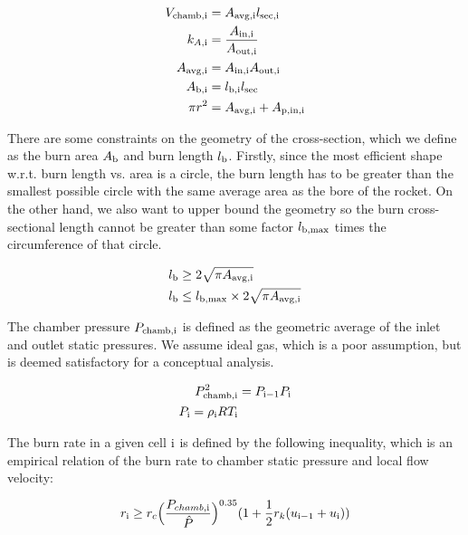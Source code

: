 \begin{align}
    V_{\rm{chamb}, \rm{i}} &= A_{\rm{avg}, \rm{i}} l_{\rm{sec}, \rm{i}} \\
    k_{A, \rm{i}} &= \frac{A_{\rm{in}, \rm{i}}}{A_{\rm{out}, \rm{i}}}  \\
    A_{\rm{avg, i}} &= A_{\rm{in}, \rm{i}} A_{\rm{out}, \rm{i}} \\
    A_{\rm{b, i}} &= l_{\rm{b,i}} l_{\rm{sec}} \\
    \pi r^2 &= A_{\rm{avg, i}} + A_{\rm{p, in, i}}
\end{align}

There are some constraints on the geometry of the cross-section, which we define
as the burn area $A_{\rm{b}}$ and burn length $l_{\rm{b}}$. Firstly, since the most efficient
shape w.r.t. burn length vs. area is a circle, the burn length has to be greater than the smallest possible circle
with the same average area as the bore of the rocket. On the other hand, we also want to
upper bound the geometry so the burn cross-sectional length cannot be greater than some factor
$l_{\rm{b,max}}$ times the circumference of that circle.

\begin{align}
    l_{\rm{b}} &\geq 2 \sqrt{\pi A_{\rm{avg, i}}} \\
    l_{\rm{b}} &\leq l_{\rm{b,max}} \times 2 \sqrt{\pi A_{\rm{avg, i}}}
\end{align}

The chamber pressure $P_{\rm{chamb}, \rm{i}}$ is defined as the geometric average of
the inlet and outlet static pressures. We assume ideal gas, which is a poor assumption,
but is deemed satisfactory for a conceptual analysis.

\begin{align}
    P_{\rm{chamb}, \rm{i}}^2 &= P_{\rm{i}-1} P_{\rm{i}} \\
    P_{\rm{i}} = \rho_{\rm{i}} R T_{\rm{i}} \\
\end{align}

The burn rate in a given cell $\rm{i}$ is defined by the following inequality,
which is an empirical relation of the burn rate to chamber static
pressure and local flow velocity:

\begin{equation}
r_{\rm{i}} \geq r_c  \Big(\frac{P_{chamb,\rm{i}}}{\hat{P}}\Big)^{0.35} (1 + \frac{1}{2} r_k (u_{\rm{i}-1} + u_{\rm{i}}))
\end{equation}


